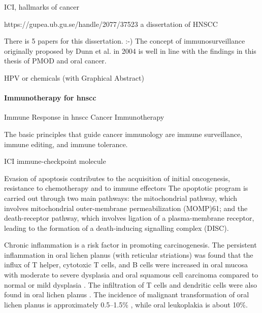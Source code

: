 \documentclass[12pt, a4paper]{article}
\begin{document}
ICI, hallmarks of cancer

https://gupea.ub.gu.se/handle/2077/37523 a dissertation of HNSCC

There is 5 papers for this dissertation. :-)
The concept of immunosurveillance originally proposed by Dunn et al. in 2004 is well in line with the findings in this thesis of PMOD and oral cancer.

HPV or chemicals (with Graphical Abstract)



\paragraph{Immunotherapy for \acrshort{hnscc}}
Immune Response in \acrshort{hnscc}
Cancer Immunotherapy

The basic principles that guide cancer immunology are immune surveillance, immune editing, and immune tolerance\citep{Sharma2017}.

ICI immune-checkpoint molecule


Evasion of apoptosis contributes to the acquisition of initial oncogenesis, resistance to chemotherapy and to immune effectors
The apoptotic program is carried out through two main pathways: the mitochondrial pathway, which involves mitochondrial outer-membrane permeabilization (MOMP)61; and the death-receptor pathway, which involves ligation of a plasma-membrane receptor, leading to the formation of a death-inducing signalling complex (DISC).

Chronic inflammation is a risk factor in promoting carcinogenesis. The persistent inflammation in oral lichen planus (with reticular striations) was found that the influx of T helper, cytotoxic T cells, and B cells were increased in oral mucosa with moderate to severe dysplasia and oral squamous cell carcinoma compared to normal or mild dysplasia \citep{Gannot2002}. The infiltration of T cells and dendritic cells were also found in oral lichen planus \citep{Lorenzini2013}.
The incidence of malignant transformation of oral lichen planus is approximately 0.5–1.5\% \citep{Bermejo-Fenoll2009}, while oral leukoplakia is about 10\%.
\end{document}
